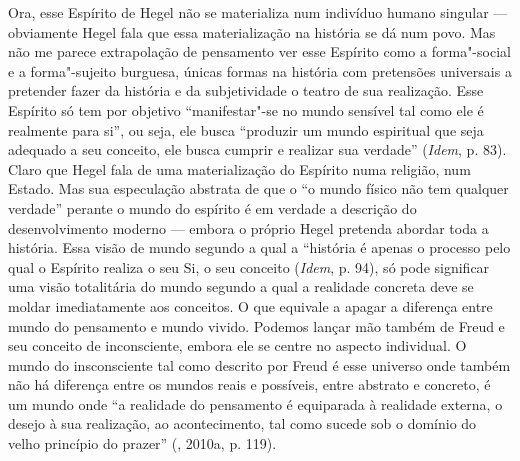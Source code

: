 Ora, esse Espírito de Hegel não se materializa num indivíduo humano
singular --- obviamente Hegel fala que essa materialização na história se
dá num povo. Mas não me parece extrapolação de pensamento ver esse
Espírito como a forma"-social e a forma"-sujeito burguesa, únicas formas
na história com pretensões universais a pretender fazer da história e da
subjetividade o teatro de sua realização. Esse Espírito só tem por
objetivo ``manifestar"-se no mundo sensível tal como ele é realmente para
si'', ou seja, ele busca ``produzir um mundo espiritual que seja
adequado a seu conceito, ele busca cumprir e realizar sua verdade''
(\emph{Idem}, p. 83). Claro que Hegel fala de uma materialização do
Espírito numa religião, num Estado. Mas sua especulação abstrata de que
o ``o mundo físico não tem qualquer verdade'' perante o mundo do
espírito é em verdade a descrição do desenvolvimento moderno --- embora o
próprio Hegel pretenda abordar toda a história. Essa visão de mundo
segundo a qual a ``história é apenas o processo pelo qual o Espírito
realiza o seu Si, o seu conceito (\emph{Idem}, p. 94), só pode
significar uma visão totalitária do mundo segundo a qual a realidade
concreta deve se moldar imediatamente aos conceitos. O que equivale a
apagar a diferença entre mundo do pensamento e mundo vivido. Podemos
lançar mão também de Freud e seu conceito de inconsciente, embora ele se
centre no aspecto individual. O mundo do insconsciente tal como descrito
por Freud é esse universo onde também não há diferença entre os mundos
reais e possíveis, entre abstrato e concreto, é um mundo onde ``a
realidade do pensamento é equiparada à realidade externa, o desejo à sua
realização, ao acontecimento, tal como sucede sob o domínio do velho
princípio do prazer'' (, 2010a, p. 119).

